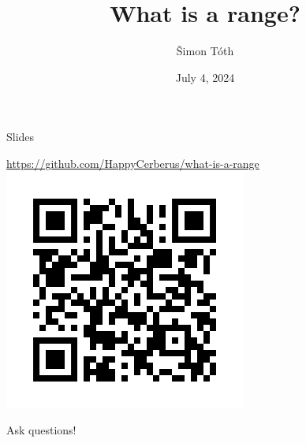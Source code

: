 \documentclass[aspectratio=169]{beamer}
\date{July 4, 2024}
\title{What is a range?}
\author{Šimon Tóth}
\begin{document}
{ 
\begin{frame}
\end{frame}}

\begin{frame}{Slides}
\Large
\begin{center}
    \url{https://github.com/HappyCerberus/what-is-a-range}
    \includegraphics[height=.7\textheight]{static/qrcode.png}
\end{center}
\end{frame}

\begin{frame}[c]
    \Huge
    \begin{center}
        Ask questions!
    \end{center}
\end{frame}
\end{document}
